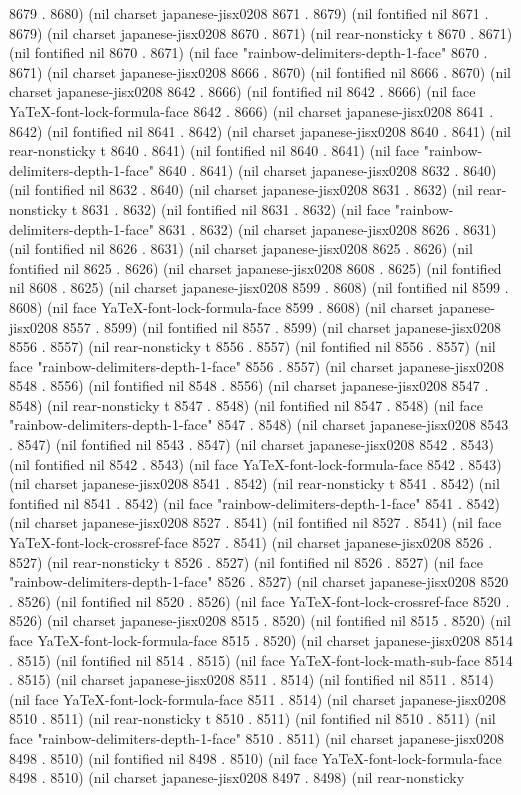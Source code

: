 8679 . 8680) (nil charset japanese-jisx0208 8671 . 8679) (nil fontified nil 8671 . 8679) (nil charset japanese-jisx0208 8670 . 8671) (nil rear-nonsticky t 8670 . 8671) (nil fontified nil 8670 . 8671) (nil face "rainbow-delimiters-depth-1-face" 8670 . 8671) (nil charset japanese-jisx0208 8666 . 8670) (nil fontified nil 8666 . 8670) (nil charset japanese-jisx0208 8642 . 8666) (nil fontified nil 8642 . 8666) (nil face YaTeX-font-lock-formula-face 8642 . 8666) (nil charset japanese-jisx0208 8641 . 8642) (nil fontified nil 8641 . 8642) (nil charset japanese-jisx0208 8640 . 8641) (nil rear-nonsticky t 8640 . 8641) (nil fontified nil 8640 . 8641) (nil face "rainbow-delimiters-depth-1-face" 8640 . 8641) (nil charset japanese-jisx0208 8632 . 8640) (nil fontified nil 8632 . 8640) (nil charset japanese-jisx0208 8631 . 8632) (nil rear-nonsticky t 8631 . 8632) (nil fontified nil 8631 . 8632) (nil face "rainbow-delimiters-depth-1-face" 8631 . 8632) (nil charset japanese-jisx0208 8626 . 8631) (nil fontified nil 8626 . 8631) (nil charset japanese-jisx0208 8625 . 8626) (nil fontified nil 8625 . 8626) (nil charset japanese-jisx0208 8608 . 8625) (nil fontified nil 8608 . 8625) (nil charset japanese-jisx0208 8599 . 8608) (nil fontified nil 8599 . 8608) (nil face YaTeX-font-lock-formula-face 8599 . 8608) (nil charset japanese-jisx0208 8557 . 8599) (nil fontified nil 8557 . 8599) (nil charset japanese-jisx0208 8556 . 8557) (nil rear-nonsticky t 8556 . 8557) (nil fontified nil 8556 . 8557) (nil face "rainbow-delimiters-depth-1-face" 8556 . 8557) (nil charset japanese-jisx0208 8548 . 8556) (nil fontified nil 8548 . 8556) (nil charset japanese-jisx0208 8547 . 8548) (nil rear-nonsticky t 8547 . 8548) (nil fontified nil 8547 . 8548) (nil face "rainbow-delimiters-depth-1-face" 8547 . 8548) (nil charset japanese-jisx0208 8543 . 8547) (nil fontified nil 8543 . 8547) (nil charset japanese-jisx0208 8542 . 8543) (nil fontified nil 8542 . 8543) (nil face YaTeX-font-lock-formula-face 8542 . 8543) (nil charset japanese-jisx0208 8541 . 8542) (nil rear-nonsticky t 8541 . 8542) (nil fontified nil 8541 . 8542) (nil face "rainbow-delimiters-depth-1-face" 8541 . 8542) (nil charset japanese-jisx0208 8527 . 8541) (nil fontified nil 8527 . 8541) (nil face YaTeX-font-lock-crossref-face 8527 . 8541) (nil charset japanese-jisx0208 8526 . 8527) (nil rear-nonsticky t 8526 . 8527) (nil fontified nil 8526 . 8527) (nil face "rainbow-delimiters-depth-1-face" 8526 . 8527) (nil charset japanese-jisx0208 8520 . 8526) (nil fontified nil 8520 . 8526) (nil face YaTeX-font-lock-crossref-face 8520 . 8526) (nil charset japanese-jisx0208 8515 . 8520) (nil fontified nil 8515 . 8520) (nil face YaTeX-font-lock-formula-face 8515 . 8520) (nil charset japanese-jisx0208 8514 . 8515) (nil fontified nil 8514 . 8515) (nil face YaTeX-font-lock-math-sub-face 8514 . 8515) (nil charset japanese-jisx0208 8511 . 8514) (nil fontified nil 8511 . 8514) (nil face YaTeX-font-lock-formula-face 8511 . 8514) (nil charset japanese-jisx0208 8510 . 8511) (nil rear-nonsticky t 8510 . 8511) (nil fontified nil 8510 . 8511) (nil face "rainbow-delimiters-depth-1-face" 8510 . 8511) (nil charset japanese-jisx0208 8498 . 8510) (nil fontified nil 8498 . 8510) (nil face YaTeX-font-lock-formula-face 8498 . 8510) (nil charset japanese-jisx0208 8497 . 8498) (nil rear-nonsticky 